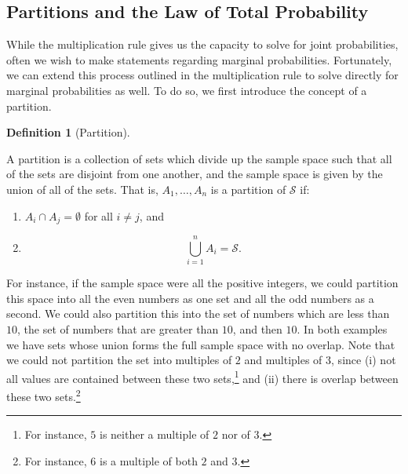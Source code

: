 \documentclass[
  letterpaper,
  DIV=11,
  numbers=noendperiod]{scrreprt}
\providecommand{\tightlist}{%
  \setlength{\itemsep}{0pt}\setlength{\parskip}{0pt}}\usepackage{longtable,booktabs,array}
\theoremstyle{definition}
\theoremstyle{definition}
\theoremstyle{definition}
\newtheorem{definition}{Definition}[chapter]
\theoremstyle{remark}
\begin{document}
\subsection{Partitions and the Law of Total
Probability}\label{partitions-and-the-law-of-total-probability}

While the multiplication rule gives us the capacity to solve for joint
probabilities, often we wish to make statements regarding marginal
probabilities. Fortunately, we can extend this process outlined in the
multiplication rule to solve directly for marginal probabilities as
well. To do so, we first introduce the concept of a partition.

\begin{definition}[Partition]\protect\hypertarget{def-partition}{}\label{def-partition}

A partition is a collection of sets which divide up the sample space
such that all of the sets are disjoint from one another, and the sample
space is given by the union of all of the sets. That is,
\(A_1,\dots,A_n\) is a partition of \(\mathcal{S}\) if:

\begin{enumerate}
\def\labelenumi{\arabic{enumi}.}
\tightlist
\item
  \(A_i \cap A_j = \emptyset\) for all \(i \neq j\), and
\item
  \[\bigcup_{i=1}^n A_i = \mathcal{S}.\]
\end{enumerate}

\end{definition}

For instance, if the sample space were all the positive integers, we
could partition this space into all the even numbers as one set and all
the odd numbers as a second. We could also partition this into the set
of numbers which are less than \(10\), the set of numbers that are
greater than \(10\), and then \(10\). In both examples we have sets
whose union forms the full sample space with no overlap. Note that we
could not partition the set into multiples of \(2\) and multiples of
\(3\), since (i) not all values are contained between these two
sets,\footnote{For instance, \(5\) is neither a multiple of \(2\) nor of
  \(3\).} and (ii) there is overlap between these two sets.\footnote{For
  instance, \(6\) is a multiple of both \(2\) and \(3\).}
\end{document}
